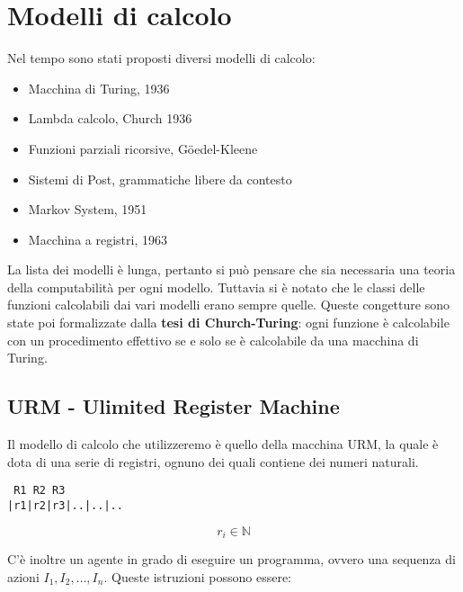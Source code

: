 
\section{Modelli di calcolo}

Nel tempo sono stati proposti diversi modelli di calcolo:

\begin{itemize}
\item
  Macchina di Turing, 1936
\item
  Lambda calcolo, Church 1936
\item
  Funzioni parziali ricorsive, G\"{o}edel-Kleene
\item
  Sistemi di Post, grammatiche libere da contesto
\item
  Markov System, 1951
\item
  Macchina a registri, 1963
\end{itemize}

La lista dei modelli è lunga, pertanto si può pensare che sia necessaria una teoria della computabilità per ogni modello. 
Tuttavia si è notato che le classi delle funzioni calcolabili dai vari modelli erano sempre quelle. 
Queste congetture sono state poi formalizzate dalla \textbf{tesi di Church-Turing}: ogni funzione è calcolabile con un procedimento effettivo se e solo se è calcolabile da una macchina di Turing.

\subsection{URM - Ulimited Register Machine}\label{urm---ulimited-register-machine}

Il modello di calcolo che utilizzeremo è quello della macchina URM, la quale è dota di una serie di registri, ognuno dei quali contiene dei numeri naturali.

\begin{verbatim}
 R1 R2 R3
|r1|r2|r3|..|..|..
\end{verbatim}

$$r_i \in \mathbb{N}$$

C'è inoltre un agente in grado di eseguire un programma, ovvero una sequenza di azioni $ I_1, I_2, \ldots, I_n$.
Queste istruzioni possono essere:

